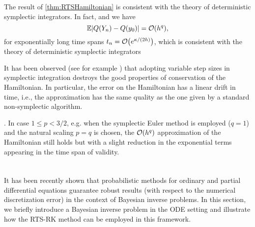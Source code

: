 \documentclass[10pt]{article}
\begin{document}
\begin{remark} The result of \cref{thm:RTSHamiltonian} is consistent with the theory of deterministic symplectic integrators. In fact,  and we have 
	\begin{equation}
	\operatorname{\mathbb{E}} \lvert Q(Y_n) - Q(y_0)\rvert = \mathcal{O}(h^q),
	\end{equation}
	for exponentially long time spans $t_n = \mathcal{O}\big(e^{\kappa/(2h)}\big)$, which is consistent with the theory of deterministic symplectic integrators 
\end{remark}
\begin{remark} It has been observed (see for example \cite{Hai97, HLW06}) that adopting variable step sizes in symplectic integration destroys the good properties of conservation of the Hamiltonian. In particular, the error on the Hamiltonian has a linear drift in time, i.e., the approximation has the same quality as the one given by a standard non-symplectic algorithm. 
\end{remark}
\begin{remark} . In case $1 \leq p < 3/2$, e.g. when the symplectic Euler method is employed ($q = 1$) and the natural scaling $p = q$ is chosen, the $\mathcal{O}(h^q)$ approximation of the Hamiltonian still holds but with a slight reduction in the exponential terms appearing in the time span of validity.
\end{remark}

\section{}\label{sec:BayesianInference} It has been recently shown \cite{CGS17, CCC16, LST18} that probabilistic methods for ordinary and partial differential equations guarantee robust results (with respect to the numerical discretization error) in the context of Bayesian inverse problems. In this section, we briefly introduce a Bayesian inverse problem in the ODE setting and illustrate how the RTS-RK method can be employed in this framework. 
\end{document}
